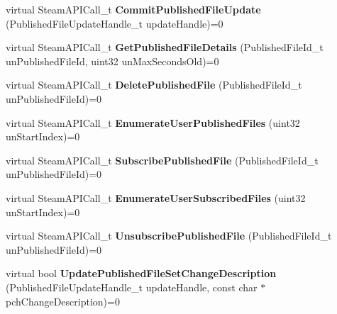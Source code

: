 \begin{DoxyCompactItemize}
\item 
\hypertarget{classISteamRemoteStorage_a9c0a559d9072e5c6be1c13ee590e5ede}{}virtual Steam\+A\+P\+I\+Call\+\_\+t {\bfseries Commit\+Published\+File\+Update} (Published\+File\+Update\+Handle\+\_\+t update\+Handle)=0\label{classISteamRemoteStorage_a9c0a559d9072e5c6be1c13ee590e5ede}

\item 
\hypertarget{classISteamRemoteStorage_a2b1aa3a242dcf7c342f2c8af73e8c811}{}virtual Steam\+A\+P\+I\+Call\+\_\+t {\bfseries Get\+Published\+File\+Details} (Published\+File\+Id\+\_\+t un\+Published\+File\+Id, uint32 un\+Max\+Seconds\+Old)=0\label{classISteamRemoteStorage_a2b1aa3a242dcf7c342f2c8af73e8c811}

\item 
\hypertarget{classISteamRemoteStorage_a8818c5b4ec06198d45a19631db56213c}{}virtual Steam\+A\+P\+I\+Call\+\_\+t {\bfseries Delete\+Published\+File} (Published\+File\+Id\+\_\+t un\+Published\+File\+Id)=0\label{classISteamRemoteStorage_a8818c5b4ec06198d45a19631db56213c}

\item 
\hypertarget{classISteamRemoteStorage_aaf2b05085df5067dd731bf3777e02a2d}{}virtual Steam\+A\+P\+I\+Call\+\_\+t {\bfseries Enumerate\+User\+Published\+Files} (uint32 un\+Start\+Index)=0\label{classISteamRemoteStorage_aaf2b05085df5067dd731bf3777e02a2d}

\item 
\hypertarget{classISteamRemoteStorage_a3df4cac951be373bc66be6e5324f3ef6}{}virtual Steam\+A\+P\+I\+Call\+\_\+t {\bfseries Subscribe\+Published\+File} (Published\+File\+Id\+\_\+t un\+Published\+File\+Id)=0\label{classISteamRemoteStorage_a3df4cac951be373bc66be6e5324f3ef6}

\item 
\hypertarget{classISteamRemoteStorage_ab39ab7e052ce10b0a350a827094fa510}{}virtual Steam\+A\+P\+I\+Call\+\_\+t {\bfseries Enumerate\+User\+Subscribed\+Files} (uint32 un\+Start\+Index)=0\label{classISteamRemoteStorage_ab39ab7e052ce10b0a350a827094fa510}

\item 
\hypertarget{classISteamRemoteStorage_a0f762d7a28946f833efc79745d92a951}{}virtual Steam\+A\+P\+I\+Call\+\_\+t {\bfseries Unsubscribe\+Published\+File} (Published\+File\+Id\+\_\+t un\+Published\+File\+Id)=0\label{classISteamRemoteStorage_a0f762d7a28946f833efc79745d92a951}

\item 
\hypertarget{classISteamRemoteStorage_a22db8016028cb529aea0ea0ae486189c}{}virtual bool {\bfseries Update\+Published\+File\+Set\+Change\+Description} (Published\+File\+Update\+Handle\+\_\+t update\+Handle, const char $\ast$pch\+Change\+Description)=0\label{classISteamRemoteStorage_a22db8016028cb529aea0ea0ae486189c}


\end{DoxyCompactItemize}
